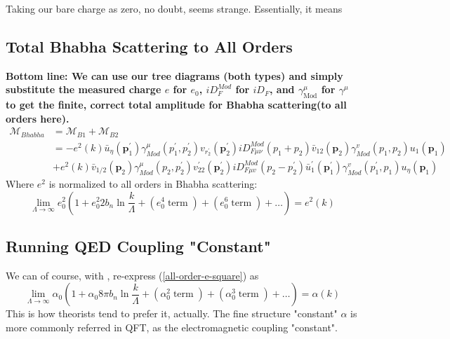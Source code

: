Taking our bare charge as zero, no doubt, seems strange. Essentially, it means 

\subsection{Total Bhabha Scattering to All Orders}
\textbf{Bottom line: We can use our tree diagrams (both types) and simply substitute the measured charge $e$ for $e_0$, $iD^{Mod}_F$ for $i D_{F}$, and $\gamma_{\text {Mod}}^{\mu}$ for $\gamma^{\mu}$ to get the finite, correct total amplitude for Bhabha scattering(to all orders here).}
$$\begin{aligned}
\mathcal{M}_{Bhabha}&=\mathcal{M}_{B1}+\mathcal{M}_{B2}\\
&=-e^{2}(k) \bar{u}_{\eta}\left(\mathbf{p}_{1}^{\prime}\right) \gamma_{M o d}^{\mu}\left(p_{1}^{\prime}, p_{2}^{\prime}\right) v_{r_{2}^{\prime}}\left(\mathbf{p}_{2}^{\prime}\right) i D_{F \mu \nu}^{M o d}\left(p_{1}+p_{2}\right) \bar{v}_{12}\left(\mathbf{p}_{2}\right) \gamma_{Mod}^{v}\left(p_{1}, p_{2}\right) u_{1}\left(\mathbf{p}_{1}\right)\\
&+e^{2}(k) \bar{v}_{1 / 2}\left(\mathbf{p}_{2}\right) \gamma_{M o d}^{\mu}\left(p_{2}, p_{2}^{\prime}\right) v_{22}^{\prime}\left(\mathbf{p}_{2}^{\prime}\right) i D_{F \mu v}^{M o d}\left(p_{2}-p_{2}^{\prime}\right) \bar{u}_{1}^{\prime}\left(\mathbf{p}_{1}^{\prime}\right) \gamma_{M o d}^{v}\left(p_{1}^{\prime}, p_{1}\right) u_{\eta}\left(\mathbf{p}_{1}\right)
\end{aligned}$$
Where $e^2$ is normalized to all orders in Bhabha scattering:
\begin{equation}
\lim_{\Lambda \to \infty} e_{0}^{2}\left(1+e_{0}^{2} 2 b_{n} \ln \frac{k}{\Lambda}+\left(e_{0}^{4} \operatorname{term}\right)+\left(e_{0}^{6} \operatorname{term}\right)+\ldots\right)=e^{2}(k)
\label{all-order-e-square}
\end{equation}
\subsection{Running QED Coupling "Constant"}
We can of course, with \textbf{}, re-express (\ref{all-order-e-square}) as
\begin{equation}
\lim_{\Lambda\rightarrow \infty} \alpha_{0}\left(1+\alpha_{0} 8 \pi b_{n} \ln \frac{k}{\Lambda}+\left(\alpha_{0}^{2} \operatorname{term}\right)+\left(\alpha_{0}^{3} \operatorname{term}\right)+\ldots\right)=\alpha(k)
\end{equation}
This is how theorists tend to prefer it, actually. The fine structure "constant" $\alpha$ is more commonly referred in QFT, as the electromagnetic coupling "constant".

